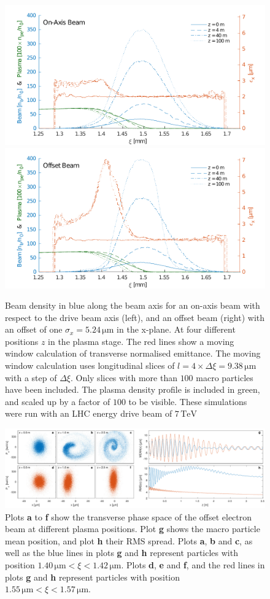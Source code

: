 \documentclass[aps,prstab,reprint,amsmath,amssymb,groupedaddress]{revtex4-1}
\newcommand{\unit}[1]{\,\mathrm{#1}}
\begin{document}
\begin{figure}[hbt]
    \includegraphics[width=0.495\linewidth,trim={2mm 0mm 2mm 0mm},clip]{figures/beamEmittance}
    \includegraphics[width=0.495\linewidth,trim={2mm 0mm 2mm 0mm},clip]{figures/beamEmittanceOffset}
    \caption{\label{Fig:BeamEmitt} Beam density in blue along the beam axis for an on-axis beam with respect to the
        drive beam axis (left), and an offset beam (right) with an offset of one $\sigma_{x} = 5.24\unit{\mu m}$ in the
        x-plane. At four different positions $z$ in the plasma stage. The red lines show a moving window calculation of
        transverse normalised emittance. The moving window calculation uses longitudinal slices of
        $l = 4\times\Delta\xi = 9.38\unit{\mu m}$ with a step of $\Delta\xi$. Only slices with more than $100$ macro
        particles have been included. The plasma density profile is included in green, and scaled up by a factor of
        $100$ to be visible. These simulations were run with an LHC energy drive beam of $7\unit{TeV}$}
\end{figure}

\begin{figure}[hbt]
    \includegraphics[width=\linewidth,trim={0mm 0mm 0mm 0mm},clip]{figures/beamFilamentationAll}
    \caption{\label{Fig:BeamFilament} Plots \textbf{a} to \textbf{f} show the transverse phase space of the offset
        electron beam at different plasma positions. Plot \textbf{g} shows the macro particle mean position, and plot
        \textbf{h} their RMS spread. Plots \textbf{a}, \textbf{b} and \textbf{c}, as well as the blue lines in plots
        \textbf{g} and \textbf{h} represent particles with position $1.40\unit{\mu m} < \xi < 1.42\unit{\mu m}$. Plots
        \textbf{d}, \textbf{e} and \textbf{f}, and the red lines in plots \textbf{g} and \textbf{h} represent particles
        with position $1.55\unit{\mu m} < \xi < 1.57\unit{\mu m}$.}
\end{figure}
\end{document}
